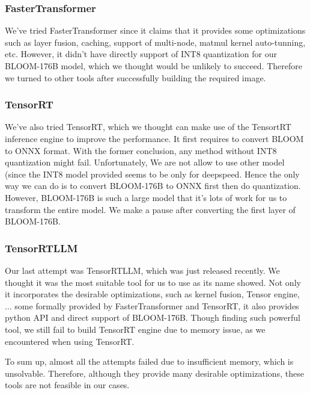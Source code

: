 \subsubsection{FasterTransformer} \cite{fastertransformer}
We've tried FasterTransformer since it claims that it provides some optimizations such as layer fusion, caching, support of multi-node, matmul kernel auto-tunning, etc.
However, it didn't have directly support of INT8 quantization for our BLOOM-176B model, which we thought would be unlikely to succeed. Therefore we turned to other tools after successfully building the required image.
\subsubsection{TensorRT} \cite{tensorrt}
We've also tried TensorRT, which we thought can make use of the TensortRT inference engine to improve the performance.
It first requires to convert BLOOM to ONNX format. With the former conclusion, any method without INT8 quantization might fail. Unfortunately, We are not allow to use other model (since the INT8 model provided seems to be only for deepspeed. Hence the only way we can do is to convert BLOOM-176B to ONNX first then do quantization. However, BLOOM-176B is such a large model that it's lots of work for us to transform the entire model. We make a pause after converting the first layer of BLOOM-176B.
\subsubsection{TensorRTLLM} \cite{tensorrt-llm}
Our last attempt was TensorRTLLM, which was just released recently. We thought it was the most suitable tool for us to use as its name showed. Not only it incorporates the desirable optimizations, such as kernel fusion, Tensor engine, ... some formally provided by FasterTransformer and TensorRT, it also provides python API and direct support of BLOOM-176B.
Though finding such powerful tool, we still fail to build TensorRT engine due to memory issue, as we encountered when using TensorRT.

To sum up, almost all the attempts failed due to insufficient memory, which is unsolvable. Therefore, although they provide many desirable optimizations, these tools are not feasible in our cases.